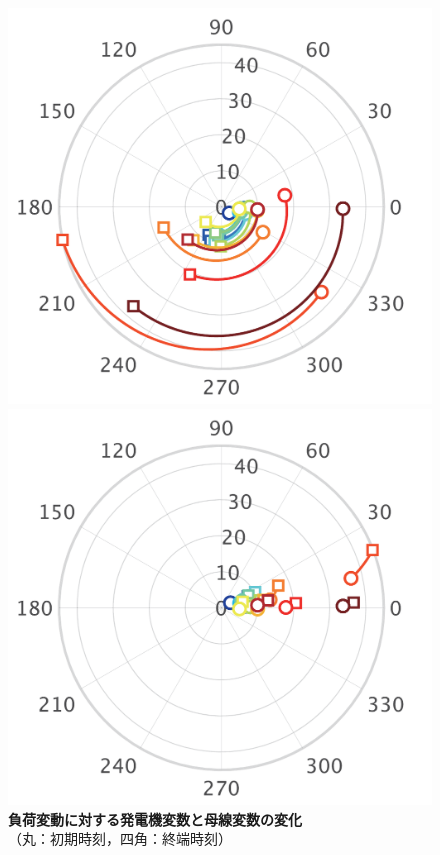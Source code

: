 \documentclass[tombow,dvipdfmx]{corona-a5-1.1}
\begin{document}
\begin{figure}[t!]
{\begin{minipage}{0.49\linewidth}
    \medskip
  \end{minipage}
 \begin{minipage}{0.49\linewidth}
    \centering
    \includegraphics[width = 0.9\linewidth]{figs/Ipolar}
    \medskip
  \end{minipage}
  \begin{minipage}{0.49\linewidth}
    \centering
    \includegraphics[width = 0.9\linewidth]{figs/PQpolar}
    \medskip
  \end{minipage}
  }
  \medskip
  \caption{\textbf{負荷変動に対する発電機変数と母線変数の変化}
  \\  \centering（丸：初期時刻，四角：終端時刻）}
  \label{fig:polars}
\medskip
\end{figure}
\end{document}
